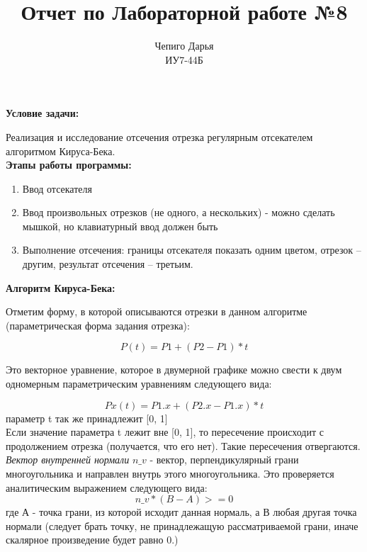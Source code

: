 \documentclass[a4paper,12pt]{article}
\title{Отчет по Лабораторной работе №8\\[150mm]}
\author{Чепиго Дарья \\ИУ7-44Б}
\date{}
\begin{document}
	\begin{titlepage}
		\maketitle
		\thispagestyle{empty}
	\end{titlepage}
	
	\newpage
	\noindent\textbf{Условие задачи:}

	Реализация и исследование отсечения отрезка регулярным отсекателем алгоритмом Кируса-Бека.\\
	
	\noindent\textbf{Этапы работы программы:}
	\begin{enumerate} 
		\item Ввод отсекателя
		\item Ввод произвольных отрезков (не одного, а нескольких) - можно сделать мышкой, но клавиатурный ввод должен быть
		\item Выполнение отсечения: границы отсекателя показать одним цветом, отрезок -- другим, результат отсечения -- третьим.
	\end{enumerate}
	
	\noindent\textbf{Алгоритм Кируса-Бека:}
	
	Отметим форму, в которой описываются отрезки в данном алгоритме (параметрическая форма задания отрезка):
	
	\[P(t) = P1 + (P2  - P1) * t\]
	
	Это векторное уравнение, которое в двумерной графике можно свести к двум одномерным параметрическим уравнениям следующего вида:
	
	\[Px(t) = P1.x + (P2.x  - P1.x) * t\]
	параметр t так же принадлежит [0, 1]\\
	
	Если значение параметра t лежит вне [0, 1], то пересечение происходит с продолжением отрезка (получается, что его нет). Такие пересечения отвергаются.\\
	
	\textit{Вектор внутренней нормали} $n\_v$ - вектор, перпендикулярный грани многоугольника и направлен внутрь этого многоугольника. Это проверяется аналитическим выражением следующего вида: \[n\_v * (B - A) >= 0\]
	где А - точка грани, из которой исходит данная нормаль, а В любая другая точка нормали (следует брать точку, не принадлежащую рассматриваемой грани, иначе скалярное произведение будет равно 0.)\\
	
\end{document}
